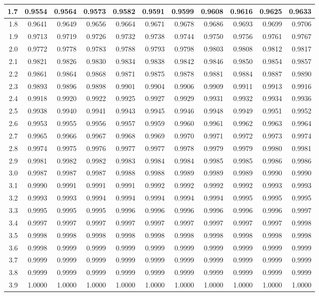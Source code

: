 \begin{center}
\begin{tabular}{|r|r@{\ }r@{\ }r@{\ }r@{\ }r@{\ }r@{\ }r@{\ }r@{\ }r@{\ }r@{\ }|}
    \hline
    1.7&0.9554&0.9564&0.9573&0.9582&0.9591&0.9599&0.9608&0.9616&0.9625&0.9633\\
    \hline
    1.8&0.9641&0.9649&0.9656&0.9664&0.9671&0.9678&0.9686&0.9693&0.9699&0.9706\\
    \hline
    1.9&0.9713&0.9719&0.9726&0.9732&0.9738&0.9744&0.9750&0.9756&0.9761&0.9767\\
    \hline
    2.0&0.9772&0.9778&0.9783&0.9788&0.9793&0.9798&0.9803&0.9808&0.9812&0.9817\\
    \hline
    2.1&0.9821&0.9826&0.9830&0.9834&0.9838&0.9842&0.9846&0.9850&0.9854&0.9857\\
    \hline
    2.2&0.9861&0.9864&0.9868&0.9871&0.9875&0.9878&0.9881&0.9884&0.9887&0.9890\\
    \hline
    2.3&0.9893&0.9896&0.9898&0.9901&0.9904&0.9906&0.9909&0.9911&0.9913&0.9916\\
    \hline
    2.4&0.9918&0.9920&0.9922&0.9925&0.9927&0.9929&0.9931&0.9932&0.9934&0.9936\\
    \hline
    2.5&0.9938&0.9940&0.9941&0.9943&0.9945&0.9946&0.9948&0.9949&0.9951&0.9952\\
    \hline
    2.6&0.9953&0.9955&0.9956&0.9957&0.9959&0.9960&0.9961&0.9962&0.9963&0.9964\\
    \hline
    2.7&0.9965&0.9966&0.9967&0.9968&0.9969&0.9970&0.9971&0.9972&0.9973&0.9974\\
    \hline
    2.8&0.9974&0.9975&0.9976&0.9977&0.9977&0.9978&0.9979&0.9979&0.9980&0.9981\\
    \hline
    2.9&0.9981&0.9982&0.9982&0.9983&0.9984&0.9984&0.9985&0.9985&0.9986&0.9986\\
    \hline
    3.0&0.9987&0.9987&0.9987&0.9988&0.9988&0.9989&0.9989&0.9989&0.9990&0.9990\\
    \hline
    3.1&0.9990&0.9991&0.9991&0.9991&0.9992&0.9992&0.9992&0.9992&0.9993&0.9993\\
    \hline
    3.2&0.9993&0.9993&0.9994&0.9994&0.9994&0.9994&0.9994&0.9995&0.9995&0.9995\\
    \hline
    3.3&0.9995&0.9995&0.9995&0.9996&0.9996&0.9996&0.9996&0.9996&0.9996&0.9997\\
    \hline
    3.4&0.9997&0.9997&0.9997&0.9997&0.9997&0.9997&0.9997&0.9997&0.9997&0.9998\\
    \hline
    3.5&0.9998&0.9998&0.9998&0.9998&0.9998&0.9998&0.9998&0.9998&0.9998&0.9998\\
    \hline
    3.6&0.9998&0.9999&0.9999&0.9999&0.9999&0.9999&0.9999&0.9999&0.9999&0.9999\\
    \hline
    3.7&0.9999&0.9999&0.9999&0.9999&0.9999&0.9999&0.9999&0.9999&0.9999&0.9999\\
    \hline
    3.8&0.9999&0.9999&0.9999&0.9999&0.9999&0.9999&0.9999&0.9999&0.9999&0.9999\\
    \hline
    3.9&1.0000&1.0000&1.0000&1.0000&1.0000&1.0000&1.0000&1.0000&1.0000&1.0000\\
    \hline
    \end{tabular}
    \end{center}
    
